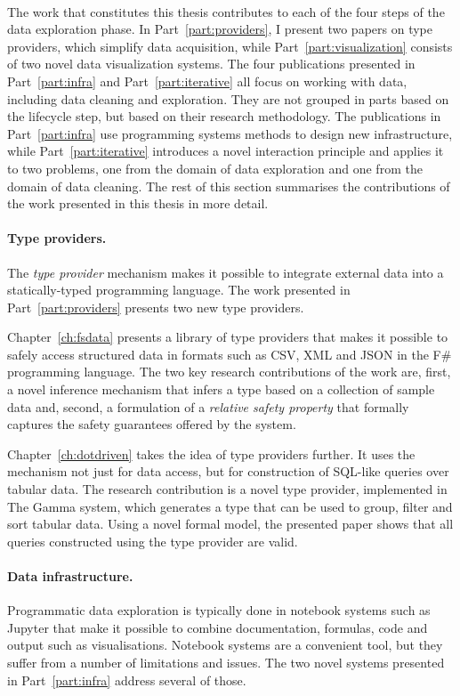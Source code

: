 \documentclass[fleqn,11pt]{report}
\theoremstyle{definition}
\begin{document}
~

The work that constitutes this thesis contributes to each of the four steps of the data
exploration phase. In Part~\ref{part:providers}, I present two papers on type providers,
which simplify data acquisition, while Part~\ref{part:visualization} consists of two
novel data visualization systems. The four publications presented in Part~\ref{part:infra}
and Part~\ref{part:iterative} all focus on working with data, including data cleaning and
exploration. They are not grouped in parts based on the lifecycle step, but based on their research
methodology. The publications in Part~\ref{part:infra} use programming systems methods to
design new infrastructure, while Part~\ref{part:iterative} introduces a novel interaction
principle and applies it to two problems, one from the domain of data exploration and one from the
domain of data cleaning. The rest of this section summarises the contributions of the work
presented in this thesis in more detail.

\paragraph{Type providers.}
The \emph{type provider} mechanism \citep{syme-2012-providers,syme-2013-inforich} makes it possible
to integrate external data into a statically-typed programming language. The work presented in
Part~\ref{part:providers} presents two new type providers.

Chapter~\ref{ch:fsdata} presents a library of type providers that makes it possible to safely access
structured data in formats such as CSV, XML and JSON in the F\# programming language. The two key
research contributions of the work are, first, a novel inference mechanism that infers a type based
on a collection of sample data and, second, a formulation of a \emph{relative safety property} that
formally captures the safety guarantees offered by the system.

Chapter~\ref{ch:dotdriven} takes the idea of type providers further. It uses the mechanism not just
for data access, but for construction of SQL-like queries over tabular data. The research
contribution is a novel type provider, implemented in The Gamma system, which generates a type that
can be used to group, filter and sort tabular data. Using a novel formal model, the presented paper
shows that all queries constructed using the type provider are valid.

\paragraph{Data infrastructure.}
Programmatic data exploration is typically done in notebook systems such as Jupyter
\citep{kluyver-2016-jupyter} that make it possible to combine documentation, formulas, code and
output such as visualisations. Notebook systems are a convenient tool, but they suffer from
a number of limitations and issues. The two novel systems presented in Part~\ref{part:infra} address
several of those.
\end{document}
